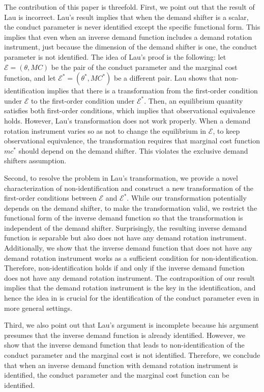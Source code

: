 \documentclass[11pt, a4paper]{article}
\theoremstyle{remark}
\begin{document}
The contribution of this paper is threefold.
First, we point out that the result of Lau is incorrect.
Lau's result implies that when the demand shifter is a scalar, the conduct parameter is never identified except the specific functional form.
This implies that even when an inverse demand function includes a demand rotation instrument, just because the dimension of the demand shifter is one, the conduct parameter is not identified.
The idea of Lau's proof is the following: let $\mathcal{E} = (\theta, MC)$ be the pair of the conduct parameter and the marginal cost function, and let $\mathcal{E}^{*} = (\theta^{*}, MC^{*})$ be a different pair.
Lau shows that non-identification implies that there is a transformation from the first-order condition under $\mathcal{E}$ to the first-order condition under $\mathcal{E}^{*}$.
Then, an equilibrium quantity satisfies both first-order conditions, which implies that observational equivalence holds.
However, Lau's transformation does not work properly.
When a demand rotation instrument varies so as not to change the equilibrium in $\mathcal{E}$, to keep observational equivalence, the transformation requires that marginal cost function $mc^{*}$ should depend on the demand shifter.
This violates the exclusive demand shifters assumption.

Second, to resolve the problem in Lau's transformation, we provide a novel characterization of non-identification and construct a new transformation of the first-order conditions between $\mathcal{E}$ and $\mathcal{E}^{*}$.
While our transformation potentially depends on the demand shifter, to make the transformation valid, we restrict the functional form of the inverse demand function so that the transformation is independent of the demand shifter.
Surprisingly, the resulting inverse demand function is separable but also does not have any demand rotation instrument.
Additionally, we show that the inverse demand function that does not have any demand rotation instrument works as a sufficient condition for non-identification.
Therefore, non-identification holds if and only if the inverse demand function does not have any demand rotation instrument. 
The contraposition of our result implies that the demand rotation instrument is the key in the identification, and hence the idea in \citet{bresnahanOligopoly1982} is crucial for the identification of the conduct parameter even in more general settings. 

Third, we also point out that Lau's argument is incomplete because his argument presumes that the inverse demand function is already identified.
However, we show that the inverse demand function that leads to non-identification of the conduct parameter and the marginal cost is not identified.
Therefore, we conclude that when an inverse demand function with demand rotation instrument is identified, the conduct parameter and the marginal cost function can be identified. 
\end{document}
